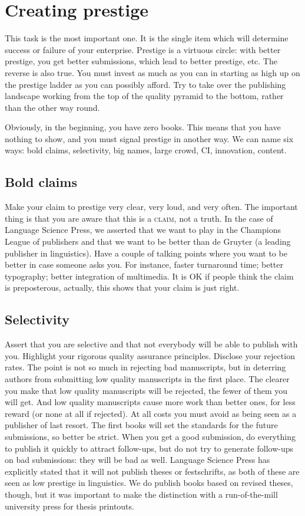 \documentclass[nonflat,smallfont
]{langsci/langscibook}
\begin{document}
\section{Creating prestige}\label{sec:prestige}
This task is the most important one. It is the single item which will determine success or failure of your enterprise. 
Prestige is a virtuous circle: with better prestige, you get better submissions, which lead to better prestige, etc. The reverse is also true. You must invest as much as you can in starting as high up on the prestige ladder as you can possibly afford. Try to take over the publishing landscape working from the top of the quality pyramid to the bottom, rather than the other way round.

Obviously, in the beginning, you have zero books. This means that you have nothing to show, and you must signal prestige in another way. We can name six ways:  
bold claims, 
selectivity, 
big names, 
large crowd, 
CI, 
innovation,
content. 

\subsection{Bold claims}
Make your claim to prestige very clear, very loud, and very often. The important thing is that you are aware that this is a \textsc{claim}, not a truth. In the case of Language Science Press, we asserted that we want to play in the Champions League of publishers and that we want to be better than de Gruyter (a leading publisher in linguistics). Have a couple of talking points where you want to be better in case someone asks you. For instance, faster turnaround time; better typography; better integration of multimedia. It is OK if people think the claim is preposterous, actually, this shows that your claim is just right. 

\subsection{Selectivity}
Assert that you are selective and that not everybody will be able to publish with you. Highlight your rigorous quality assurance principles. Disclose your rejection rates. The point is not so much in rejecting bad manuscripts, but in deterring authors from submitting low quality manuscripts in the first place. The clearer you make that low quality manuscripts will be rejected, the fewer of them  you will get. And low quality manuscripts cause more work than better ones, for less reward (or none at all if rejected). 
At all costs you must avoid as being seen as a publisher of last resort. The first books will set the standards for the future submissions, so better be strict. When you get a good submission, do everything to publish it quickly to attract follow-ups, but do not try to generate follow-ups on bad submissions: they will be bad as well. 
Language Science Press has explicitly stated that it will not publish theses or festschrifts, as both of these are seen as low prestige in linguistics. We do publish books based on revised theses, though, but it was important to make the distinction with a run-of-the-mill university press for thesis printouts.
\end{document}
